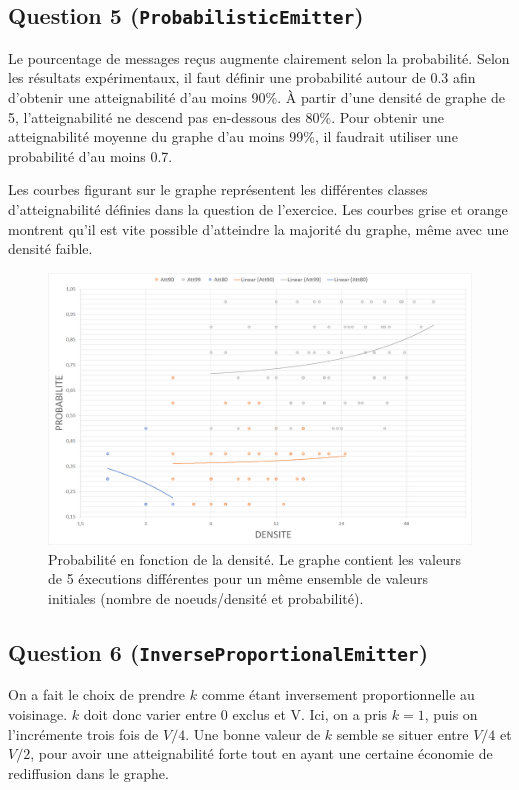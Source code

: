 \documentclass[a4paper]{article}
\begin{document}
\pagebreak

\subsection{Question 5 (\texttt{ProbabilisticEmitter})}

Le pourcentage de messages reçus augmente clairement selon la
probabilité. Selon les résultats expérimentaux, il faut définir une probabilité autour
de 0.3 afin d'obtenir une atteignabilité d'au moins 90\%. À partir
d'une densité de graphe de 5, l'atteignabilité ne descend pas
en-dessous des 80\%. Pour obtenir une atteignabilité moyenne du graphe
d'au moins 99\%, il faudrait utiliser une probabilité d'au moins 0.7.

Les courbes figurant sur le graphe représentent les différentes
classes d'atteignabilité définies dans la question de l'exercice. Les
courbes grise et orange montrent qu'il est vite possible d'atteindre la
majorité du graphe, même avec une densité faible.

\begin{figure}[H]
\begin{minipage}{\textwidth}
  \centering
    \includegraphics[width=\textwidth]{images/ex2q5-log-trendlines.png}
    \caption{Probabilité en fonction de la densité. Le graphe contient
    les valeurs de 5 éxecutions différentes pour un même ensemble de
    valeurs initiales (nombre de noeuds/densité et probabilité).}
\end{minipage}
\end{figure}

\pagebreak

\subsection{Question 6 (\texttt{InverseProportionalEmitter})}
On a fait le choix de prendre $k$ comme étant inversement
proportionnelle au voisinage. $k$ doit donc varier entre 0 exclus et
V. Ici, on a pris $k = 1$, puis on l'incrémente trois fois de
$V/4$. Une bonne valeur de $k$ semble se situer entre $V/4$ et $V/2$,
pour avoir une atteignabilité forte tout en ayant une certaine
économie de rediffusion dans le graphe.
\end{document}
